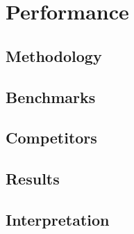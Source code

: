 \chapter{Performance}
\label{chap:Performance}

\section{Methodology}

\section{Benchmarks}

\section{Competitors}

\section{Results}

\section{Interpretation}

